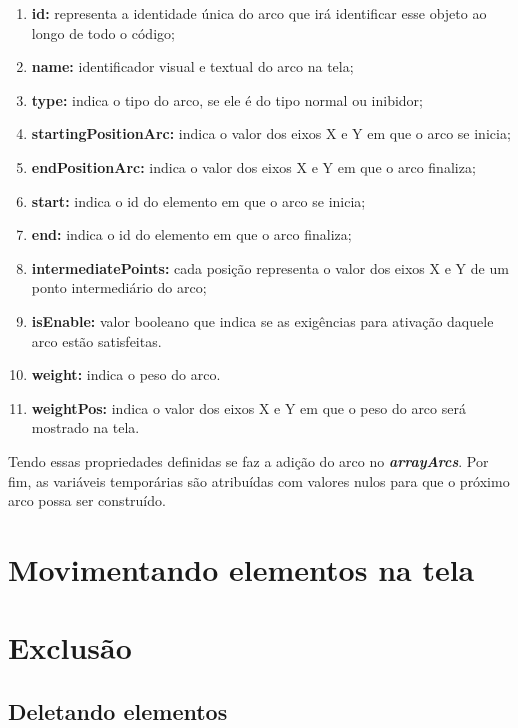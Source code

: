 \documentclass[
	12pt,				%
	openright,			%
	oneside,			%
	a4paper,			%
	english,			%
	brazil				%
	]{abntex2}
\begin{document}
\begin{enumerate}
	\item \textbf{id:} representa a identidade única do arco que irá identificar esse objeto ao longo de todo o código;
	\item \textbf{name:} identificador visual e textual do arco na tela;
	\item \textbf{type:} indica o tipo do arco, se ele é do tipo normal ou inibidor;
	\item \textbf{startingPositionArc:} indica o valor dos eixos X e Y em que o arco se inicia;
	\item \textbf{endPositionArc:} indica o valor dos eixos X e Y em que o arco finaliza;
	\item \textbf{start:} indica o id do elemento em que o arco se inicia;
	\item \textbf{end:} indica o id do elemento em que o arco finaliza;
	\item \textbf{intermediatePoints:} cada posição representa o valor dos eixos X e Y de um ponto intermediário do arco;
	\item \textbf{isEnable:} valor booleano que indica se as exigências para ativação daquele arco estão satisfeitas.
	\item \textbf{weight:} indica o peso do arco.
	\item \textbf{weightPos:} indica o valor dos eixos X e Y em que o peso do arco será mostrado na tela.
\end{enumerate}

Tendo essas propriedades definidas se faz a adição do arco no \textbf{\textit{arrayArcs}}. Por fim, as variáveis temporárias são atribuídas com valores nulos para que o próximo arco possa ser construído.



\section{Movimentando elementos na tela}\label{cap:move_elements}

\section{Exclusão}

\subsection*{Deletando elementos}
\end{document}
